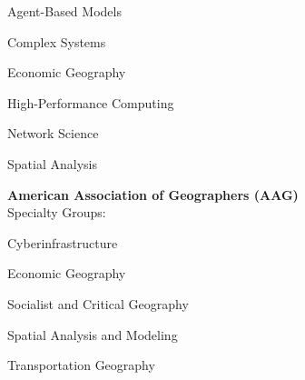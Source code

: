 \documentclass{acmresume}
\begin{document}
    
    \begin{multicols}{3}
    	\begin{titemize}
    		\item Agent-Based Models
    		\item Complex Systems
    		\item Economic Geography
    		\item High-Performance Computing
    		\item Network Science
    		\item Spatial Analysis
    	\end{titemize}
    \end{multicols}
    
    
    \textbf{American Association of Geographers (AAG)} \\
    Specialty Groups: \\ \vspace{-.3cm}
    \begin{multicols}{3}
    \begin{titemize}
        \item Cyberinfrastructure
        \item Economic Geography
        \item Socialist and Critical Geography
        \item Spatial Analysis and Modeling
        \item Transportation Geography
    \end{titemize}
    \end{multicols}
\end{document}
